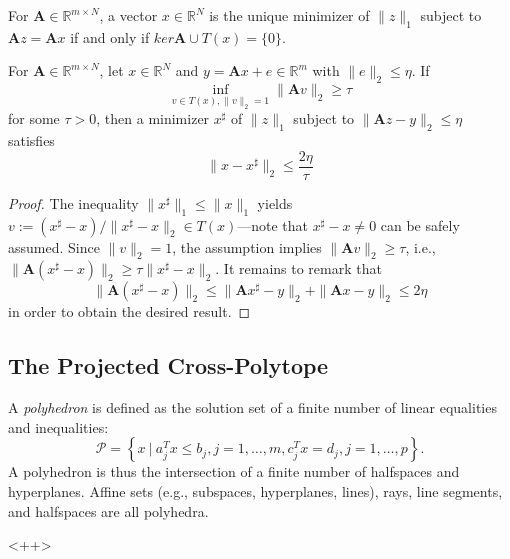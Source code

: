 \begin{theorem}
    \label{th0.4.35}
    For $\mathbf{A} \in \mathbb{R}^{m \times N}$, a vector $x \in \mathbb{R}^N$ is the unique minimizer of $\|z\|_1$ subject to $\mathbf{A}z = \mathbf{A}x$ if and only if $ker\mathbf{A} \cup T(x) = \{0\}$.
\end{theorem}

\begin{theorem}
    \label{th0.4.36}
    For $\mathbf{A} \in \mathbb{R}^{m \times N}$, let $x \in \mathbb{R}^N$ and $y= \mathbf{A}x + e \in \mathbb{R}^m$ with $\|e\|_2 \leq \eta$. If 
    \[
        \inf\limits_{v \in T(x), \|v\|_2=1} \|\mathbf{A}v\|_2 \geq \tau
    \]
    for some $\tau > 0$, then a minimizer $x^{\sharp}$ of $\|z\|_1$ subject to $\|\mathbf{A}z - y\|_2 \leq \eta$ satisfies 
    \begin{equation}
        \|x - x^{\sharp}\|_2 \leq \frac{2\eta}{\tau}
        \label{eq0.4.35}
    \end{equation}
\end{theorem}

\begin{proof}
    The inequality $\|x^{\sharp}\|_1 \leq \|x\|_1$ yields $v := (x^{\sharp} - x)/ \|x^{\sharp} - x\|_2 \in T(x)$---note that $x^{\sharp} - x \neq 0$ can be safely assumed. Since $\|v\|_2 = 1$, the assumption implies $\|\mathbf{A}v\|_2 \geq \tau$, i.e., $\|\mathbf{A}(x^{\sharp} - x)\|_2 \geq \tau \|x^{\sharp} - x\|_2$. It remains to remark that
    \[
        \|\mathbf{A}(x^{\sharp} - x)\|_2 \leq \|\mathbf{A}x^{\sharp} - y\|_2 + \|\mathbf{A}x - y\|_2 \leq 2\eta
    \]
    in order to obtain the desired result.
\end{proof}

\subsection{The Projected Cross-Polytope}
\begin{mdframed}
    \label{polytope}
    A \emph{\textcolor[rgb]{1,0,0}{polyhedron}} is defined as the solution set of a finite number of linear equalities and inequalities:
    \[
        \mathcal{P} = \left\{ x \ | \ a_j^T x \leq b_j, j =1,\dots,m, c_j^T x = d_j, j =1,\dots,p \right\}.
    \]
    A polyhedron is thus the intersection of a finite number of halfspaces and hyperplanes. Affine sets (e.g., subspaces, hyperplanes, lines), rays, line segments, and halfspaces are all polyhedra.
\end{mdframed}<++>


